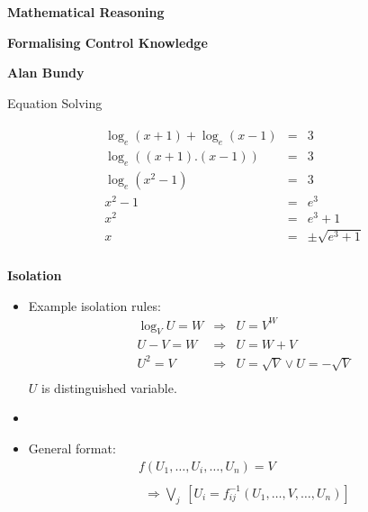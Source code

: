 


\raggedright

\begin{center}
\begin{Large}
{\bf Mathematical Reasoning} \\ [20pt]
\end{Large}
\begin{Huge}
{\bf Formalising Control Knowledge}\\ [20pt]
\end{Huge}
\begin{Large}
{\bf Alan Bundy} 
\end{Large}
\end{center}

\newpage
\begin{huge}
\begin{center} Equation Solving \end{center}
\end{huge}
\begin{LARGE}
\begin{eqnarray*}
\begin{array}{ccc}
\log_{e}(x+1)+\log_{e}(x-1) & = & 3 \\
\log_{e}((x+1).(x-1)) & = & 3 \\
\log_{e}(x^{2}-1) & = & 3 \\
x^{2}-1 & = & e^{3} \\
x^{2} & = & e^{3}+1 \\
x & = & \pm\sqrt{e^{3}+1} \\
\end{array}
\end{eqnarray*}
\end{LARGE}


%
%
%
\newpage
\centerline{\huge \bf Isolation }
\begin{LARGE}
\begin{itemize}
\item [] Example isolation rules:
\begin{eqnarray*}
\log_{V}U=W & \Rightarrow & U=V^{W} \\
U-V=W & \Rightarrow & U=W+V \\
U^{2}=V & \Rightarrow & U=\sqrt{V} \vee U=-\sqrt{V} \\
\end{eqnarray*}
\subitem $U$ is distinguished variable.
\item []
\item [] General format:
\begin{eqnarray*}
f(U_{1},\ldots,U_{i},\ldots,U_{n}) = V \\
\\
\ \ \Rightarrow {\bigvee_{j}}\ [U_{i}=f_{ij}^{-1}(U_{1},\ldots,V,\ldots,U_{n})]
\end{eqnarray*}
\end{itemize}
\end{LARGE}
\newpage

